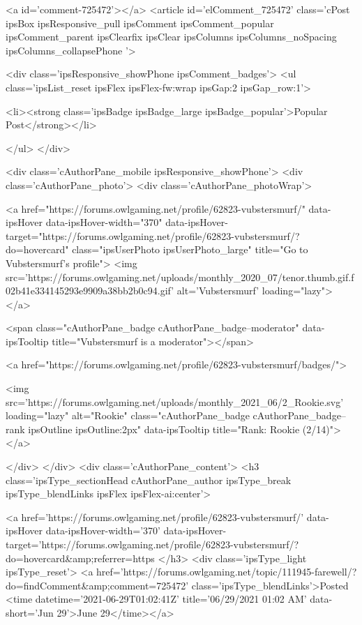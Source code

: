 <a id='comment-725472'></a>
<article  id='elComment_725472' class='cPost ipsBox ipsResponsive_pull  ipsComment ipsComment_popular ipsComment_parent ipsClearfix ipsClear ipsColumns ipsColumns_noSpacing ipsColumns_collapsePhone    '>
	

	
		<div class='ipsResponsive_showPhone ipsComment_badges'>
			<ul class='ipsList_reset ipsFlex ipsFlex-fw:wrap ipsGap:2 ipsGap_row:1'>
				
				
				
				
					<li><strong class='ipsBadge ipsBadge_large ipsBadge_popular'>Popular Post</strong></li>
				
			</ul>
		</div>
	

	<div class='cAuthorPane_mobile ipsResponsive_showPhone'>
		<div class='cAuthorPane_photo'>
			<div class='cAuthorPane_photoWrap'>
				


	<a href="https://forums.owlgaming.net/profile/62823-vubstersmurf/" data-ipsHover data-ipsHover-width="370" data-ipsHover-target="https://forums.owlgaming.net/profile/62823-vubstersmurf/?do=hovercard" class="ipsUserPhoto ipsUserPhoto_large" title="Go to Vubstersmurf's profile">
		<img src='https://forums.owlgaming.net/uploads/monthly_2020_07/tenor.thumb.gif.f02b41e334145293e9909a38bb2b0c94.gif' alt='Vubstersmurf' loading="lazy">
	</a>

				
				<span class="cAuthorPane_badge cAuthorPane_badge--moderator" data-ipsTooltip title="Vubstersmurf is a moderator"></span>
				
				
					<a href="https://forums.owlgaming.net/profile/62823-vubstersmurf/badges/">
						
<img src='https://forums.owlgaming.net/uploads/monthly_2021_06/2_Rookie.svg' loading="lazy" alt="Rookie" class="cAuthorPane_badge cAuthorPane_badge--rank ipsOutline ipsOutline:2px" data-ipsTooltip title="Rank: Rookie (2/14)">
					</a>
				
			</div>
		</div>
		<div class='cAuthorPane_content'>
			<h3 class='ipsType_sectionHead cAuthorPane_author ipsType_break ipsType_blendLinks ipsFlex ipsFlex-ai:center'>
				


<a href='https://forums.owlgaming.net/profile/62823-vubstersmurf/' data-ipsHover data-ipsHover-width='370' data-ipsHover-target='https://forums.owlgaming.net/profile/62823-vubstersmurf/?do=hovercard&amp;referrer=https%
			</h3>
			<div class='ipsType_light ipsType_reset'>
				<a href='https://forums.owlgaming.net/topic/111945-farewell/?do=findComment&amp;comment=725472' class='ipsType_blendLinks'>Posted <time datetime='2021-06-29T01:02:41Z' title='06/29/2021 01:02  AM' data-short='Jun 29'>June 29</time></a>
				
